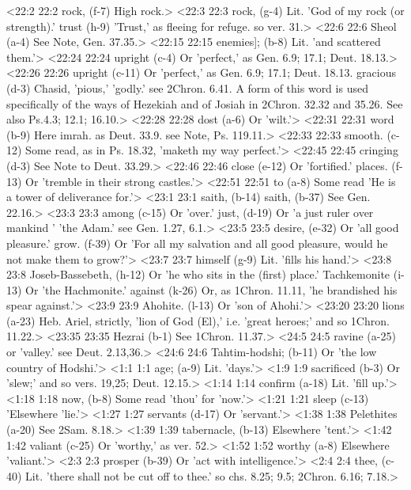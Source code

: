 <22:2 22:2  rock, (f-7)  High rock.>
<22:3 22:3  rock, (g-4)  Lit. 'God of my rock (or strength).'
  trust (h-9)  'Trust,' as fleeing for refuge. so ver. 31.>
<22:6 22:6  Sheol (a-4)  See Note, Gen. 37.35.>
<22:15 22:15  enemies]; (b-8)  Lit. 'and scattered them.'>
<22:24 22:24  upright (c-4) Or 'perfect,' as Gen. 6.9; 17.1; Deut. 18.13.>
<22:26 22:26  upright (c-11)  Or 'perfect,' as Gen. 6.9; 17.1; Deut. 18.13.
  gracious (d-3)  Chasid, 'pious,' 'godly.' see 2Chron. 6.41. A form of this  word is used specifically of the ways of Hezekiah and of Josiah  in 2Chron. 32.32 and 35.26. See also Ps.4.3; 12.1; 16.10.>
<22:28 22:28  dost (a-6)  Or 'wilt.'>
<22:31 22:31  word (b-9)  Here imrah. as Deut. 33.9. see Note, Ps. 119.11.>
<22:33 22:33  smooth. (c-12)  Some read, as in Ps. 18.32, 'maketh my way perfect.'>
<22:45 22:45  cringing (d-3)  See Note to Deut. 33.29.>
<22:46 22:46  close (e-12)  Or 'fortified.'
  places. (f-13)  Or 'tremble in their strong castles.'>
<22:51 22:51  to (a-8)  Some read 'He is a tower of deliverance for.'>
<23:1 23:1  saith, (b-14)  saith, (b-37)
  See Gen. 22.16.>
<23:3 23:3  among (c-15)  Or 'over.'
  just, (d-19)  Or 'a just ruler over mankind ' 'the Adam.' see Gen. 1.27, 6.1.>
<23:5 23:5  desire, (e-32)  Or 'all good pleasure.'
  grow. (f-39)  Or 'For all my salvation and all good pleasure, would he not  make them to grow?'>
<23:7 23:7  himself (g-9)  Lit. 'fills his hand.'>
<23:8 23:8  Joseb-Bassebeth, (h-12)  Or 'he who sits in the (first) place.'
  Tachkemonite (i-13)  Or 'the Hachmonite.'
  against (k-26)  Or, as 1Chron. 11.11, 'he brandished his spear against.'>
<23:9 23:9  Ahohite. (l-13)  Or 'son of Ahohi.'>
<23:20 23:20  lions (a-23)  Heb. Ariel, strictly, 'lion of God (El),' i.e. 'great  heroes;' and so 1Chron. 11.22.>
<23:35 23:35  Hezrai (b-1)  See 1Chron. 11.37.>
<24:5 24:5  ravine (a-25)  or 'valley.' see Deut. 2.13,36.>
<24:6 24:6  Tahtim-hodshi; (b-11)  Or 'the low country of Hodshi.'>
<1:1 1:1  age; (a-9)  Lit. 'days.'>
<1:9 1:9  sacrificed (b-3)  Or 'slew;' and so vers. 19,25; Deut. 12.15.>
<1:14 1:14  confirm (a-18)  Lit. 'fill up.'>
<1:18 1:18  now, (b-8)  Some read 'thou' for 'now.'>
<1:21 1:21  sleep (c-13)  'Elsewhere 'lie.'>
<1:27 1:27  servants (d-17)  Or 'servant.'>
<1:38 1:38  Pelethites (a-20)  See 2Sam. 8.18.>
<1:39 1:39  tabernacle, (b-13)  Elsewhere 'tent.'>
<1:42 1:42  valiant (c-25)  Or 'worthy,' as ver. 52.>
<1:52 1:52  worthy (a-8)  Elsewhere 'valiant.'>
<2:3 2:3  prosper (b-39)  Or 'act with intelligence.'>
<2:4 2:4  thee, (c-40)  Lit. 'there shall not be cut off to thee.' so chs. 8.25; 9.5;  2Chron. 6.16; 7.18.>

